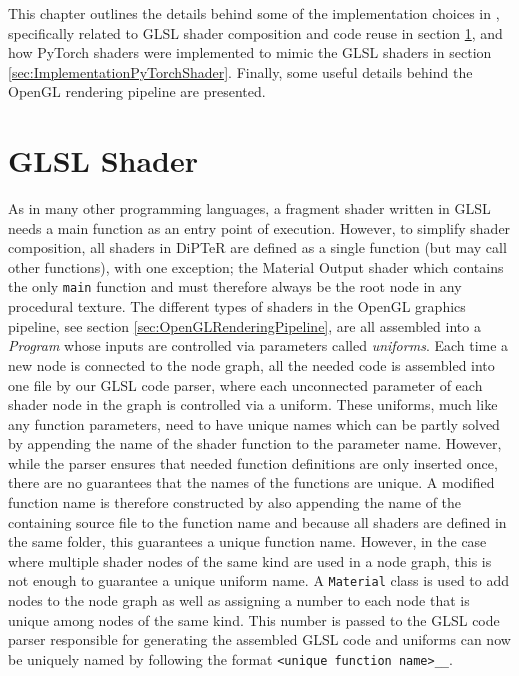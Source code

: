 This chapter outlines the details behind some of the implementation choices in \dipter{}, specifically related to GLSL shader composition and code reuse in section \ref{sec:ImplementationProceduralShadingGLSL}, and how PyTorch shaders were implemented to mimic the GLSL shaders in section \ref{sec:ImplementationPyTorchShader}. Finally, some useful details behind the OpenGL rendering pipeline are presented.

\section{GLSL Shader} \label{sec:ImplementationProceduralShadingGLSL}
 As in many other programming languages, a fragment shader written in GLSL needs a main function as an entry point of execution. However, to simplify shader composition, all shaders in DiPTeR are defined as a single function (but may call other functions), with one exception; the Material Output shader which contains the only \texttt{main} function and must therefore always be the root node in any procedural texture. The different types of shaders in the OpenGL graphics pipeline, see section \ref{sec:OpenGLRenderingPipeline}, are all assembled into a \textit{Program} whose inputs are controlled via parameters called \textit{uniforms}. Each time a new node is connected to the node graph, all the needed code is assembled into one file by our GLSL code parser, where each unconnected parameter of each shader node in the graph is controlled via a uniform. These uniforms, much like any function parameters, need to have unique names which can be partly solved by appending the name of the shader function to the parameter name. However, while the parser ensures that needed function definitions are only inserted once, there are no guarantees that the names of the functions are unique. A modified function name is therefore constructed by also appending the name of the containing source file to the function name and because all shaders are defined in the same folder, this guarantees a unique function name. However, in the case where multiple shader nodes of the same kind are used in a node graph, this is not enough to guarantee a unique uniform name. A \texttt{Material} class is used to add nodes to the node graph as well as assigning a number to each node that is unique among nodes of the same kind. This number is passed to the GLSL code parser responsible for generating the assembled GLSL code and uniforms can now be uniquely named by following the format \texttt{<unique function name>\_<node number>\_<parameter name>}. 
 

